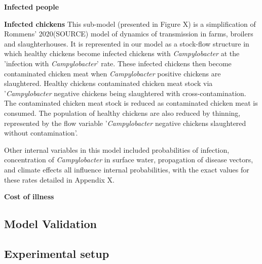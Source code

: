 \textbf{Infected people}

\textbf{Infected chickens}
This sub-model (presented in Figure X) is a simplification of Rommens' 2020(SOURCE) model of dynamics of transmission in farms, broilers and slaughterhouses. It is represented in our model as a stock-flow structure in which healthy chickens become infected chickens with \textit{Campylobacter} at the 'infection with \textit{Campylobacter}' rate. These infected chickens then become contaminated chicken meat when \textit{Campylobacter} positive chickens are slaughtered. Healthy chickens  contaminated chicken meat stock via '\textit{Campylobacter} negative chickens being slaughtered with cross-contamination. The contaminated chicken meat stock is reduced as contaminated chicken meat is consumed. The population of healthy chickens are also reduced by thinning, represented by the flow variable '\textit{Campylobacter} negative chickens slaughtered without contamination'.

Other internal variables in this model included probabilities of infection, concentration of \textit{Campylobacter} in surface water, propagation of disease vectors, and climate effects all influence internal probabilities, with the exact values for these rates detailed in Appendix X.


\textbf{Cost of illness}

\subsection{Model Validation}
    
\subsection{Experimental setup}



